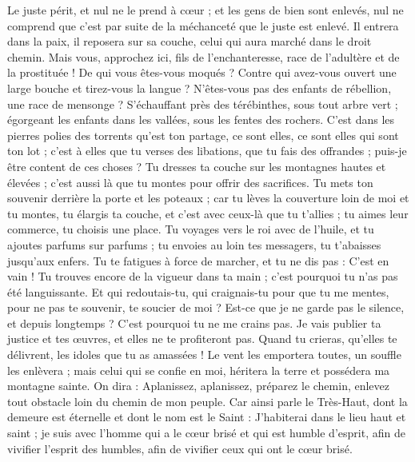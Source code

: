 \begin{multicols}{2}
\VerseOne{}Le juste périt, et nul ne le prend à cœur ; et les gens de bien sont enlevés, nul ne comprend que c'est par suite de la méchanceté que le juste est enlevé.
Il entrera dans la paix, il reposera sur sa couche, celui qui aura marché dans le droit chemin.
Mais vous, approchez ici, fils de l'enchanteresse, race de l'adultère et de la prostituée !
De qui vous êtes-vous moqués ? Contre qui avez-vous ouvert une large bouche et tirez-vous la langue ? N'êtes-vous pas des enfants de rébellion, une race de mensonge ?
S'échauffant près des térébinthes, sous tout arbre vert ; égorgeant les enfants dans les vallées, sous les fentes des rochers.
C'est dans les pierres polies des torrents qu'est ton partage, ce sont elles, ce sont elles qui sont ton lot ; c'est à elles que tu verses des libations, que tu fais des offrandes ; puis-je être content de ces choses ?
Tu dresses ta couche sur les montagnes hautes et élevées ; c'est aussi là que tu montes pour offrir des sacrifices.
Tu mets ton souvenir derrière la porte et les poteaux ; car tu lèves la couverture loin de moi et tu montes, tu élargis ta couche, et c'est avec ceux-là que tu t'allies ; tu aimes leur commerce, tu choisis une place.
Tu voyages vers le roi avec de l'huile, et tu ajoutes parfums sur parfums ; tu envoies au loin tes messagers, tu t'abaisses jusqu'aux enfers.
Tu te fatigues à force de marcher, et tu ne dis pas : C'est en vain ! Tu trouves encore de la vigueur dans ta main ; c'est pourquoi tu n'as pas été languissante.
Et qui redoutais-tu, qui craignais-tu pour que tu me mentes, pour ne pas te souvenir, te soucier de moi ? Est-ce que je ne garde pas le silence, et depuis longtemps ? C'est pourquoi tu ne me crains pas.
Je vais publier ta justice et tes œuvres, et elles ne te profiteront pas.
Quand tu crieras, qu'elles te délivrent, les idoles que tu as amassées ! Le vent les emportera toutes, un souffle les enlèvera ; mais celui qui se confie en moi, héritera la terre et possédera ma montagne sainte.
On dira : Aplanissez, aplanissez, préparez le chemin, enlevez tout obstacle loin du chemin de mon peuple.
Car ainsi parle le Très-Haut, dont la demeure est éternelle et dont le nom est le Saint : J'habiterai dans le lieu haut et saint ; je suis avec l'homme qui a le cœur brisé et qui est humble d'esprit, afin de vivifier l'esprit des humbles, afin de vivifier ceux qui ont le cœur brisé.

\end{multicols}
